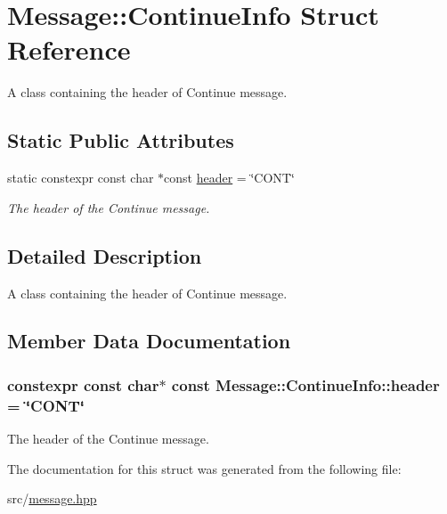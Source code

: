 \hypertarget{struct_message_1_1_continue_info}{}\section{Message\+:\+:Continue\+Info Struct Reference}
\label{struct_message_1_1_continue_info}


A class containing the header of Continue message.  


\subsection*{Static Public Attributes}
\begin{DoxyCompactItemize}
\item 
static constexpr const char $\ast$const \hyperlink{struct_message_1_1_continue_info_ae80c96209d5d458d4abdf847e53f3437}{header} = \char`\"{}C\+O\+NT\char`\"{}
\begin{DoxyCompactList}\small\item\em The header of the Continue message. \end{DoxyCompactList}\end{DoxyCompactItemize}


\subsection{Detailed Description}
A class containing the header of Continue message. 

\subsection{Member Data Documentation}
\subsubsection[{\texorpdfstring{header}{header}}]{\setlength{\rightskip}{0pt plus 5cm}constexpr const char$\ast$ const Message\+::\+Continue\+Info\+::header = \char`\"{}C\+O\+NT\char`\"{}\hspace{0.3cm}{\ttfamily [static]}}\hypertarget{struct_message_1_1_continue_info_ae80c96209d5d458d4abdf847e53f3437}{}\label{struct_message_1_1_continue_info_ae80c96209d5d458d4abdf847e53f3437}


The header of the Continue message. 



The documentation for this struct was generated from the following file\+:\begin{DoxyCompactItemize}
\item 
src/\hyperlink{message_8hpp}{message.\+hpp}\end{DoxyCompactItemize}
